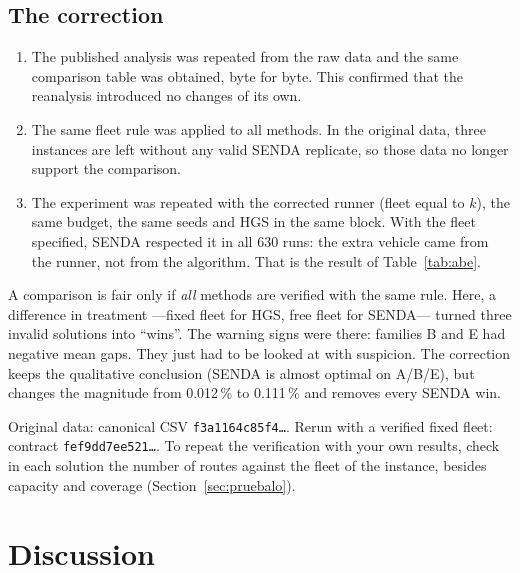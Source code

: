 \documentclass[11pt,a4paper]{article}
\newcommand{\tsl}[1]{\texttt{\small #1}}
\begin{document}
\subsection{The correction}
\begin{enumerate}[leftmargin=1.5em]
\item The published analysis was repeated from the raw data and the same comparison table was
obtained, byte for byte. This confirmed that the reanalysis introduced no changes of its own.
\item The same fleet rule was applied to all methods. In the original data, three instances are left
without any valid SENDA replicate, so those data no longer support the comparison.
\item The experiment was repeated with the corrected runner (fleet equal to $k$), the same budget, the
same seeds and HGS in the same block. With the fleet specified, SENDA respected it in all 630 runs:
the extra vehicle came from the runner, not from the algorithm. That is the result of
Table~\ref{tab:abe}.
\end{enumerate}

\begin{leccion}
A comparison is fair only if \emph{all} methods are verified with the same rule. Here, a difference in
treatment ---fixed fleet for HGS, free fleet for SENDA--- turned three invalid solutions into ``wins''.
The warning signs were there: families B and E had negative mean gaps. They just had to be looked at
with suspicion. The correction keeps the qualitative conclusion (SENDA is almost optimal on A/B/E),
but changes the magnitude from 0.012\,\% to 0.111\,\% and removes every SENDA win.
\end{leccion}

\begin{reproducir}
Original data: canonical CSV \tsl{f3a1164c85f4\ldots}. Rerun with a verified fixed fleet: contract
\tsl{fef9dd7ee521\ldots}. To repeat the verification with your own results, check in each solution
the number of routes against the fleet of the instance, besides capacity and coverage
(Section~\ref{sec:pruebalo}).
\end{reproducir}

\section{Discussion}
\label{sec:discusion}
\end{document}
